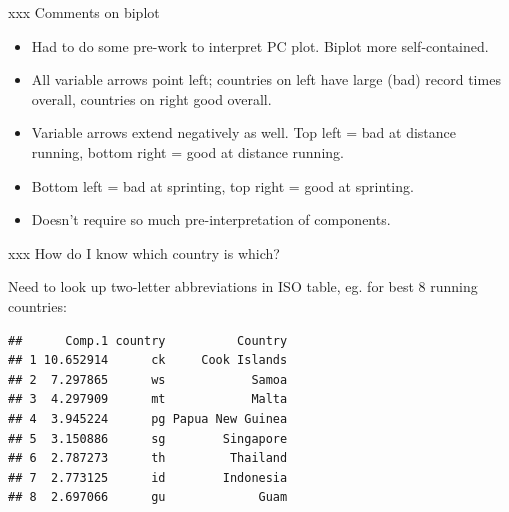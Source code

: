 \documentclass[ignorenonframetext,]{beamer}
\newenvironment{Shaded}{\begin{snugshade}}{\end{snugshade}}
\newcommand{\DataTypeTok}[1]{\textcolor[rgb]{0.13,0.29,0.53}{#1}}
\newcommand{\DecValTok}[1]{\textcolor[rgb]{0.00,0.00,0.81}{#1}}
\newcommand{\FloatTok}[1]{\textcolor[rgb]{0.00,0.00,0.81}{#1}}
\newcommand{\KeywordTok}[1]{\textcolor[rgb]{0.13,0.29,0.53}{\textbf{#1}}}
\newcommand{\NormalTok}[1]{#1}
\newcommand{\OperatorTok}[1]{\textcolor[rgb]{0.81,0.36,0.00}{\textbf{#1}}}
\newcommand{\StringTok}[1]{\textcolor[rgb]{0.31,0.60,0.02}{#1}}
\begin{document}
\begin{frame}{xxx Comments on biplot}
\protect\hypertarget{xxx-comments-on-biplot}{}

\begin{itemize}
\item
  Had to do some pre-work to interpret PC plot. Biplot more
  self-contained.
\item
  All variable arrows point left; countries on left have large (bad)
  record times overall, countries on right good overall.
\item
  Variable arrows extend negatively as well. Top left = bad at distance
  running, bottom right = good at distance running.
\item
  Bottom left = bad at sprinting, top right = good at sprinting.
\item
  Doesn't require so much pre-interpretation of components.
\end{itemize}

\end{frame}

\begin{frame}[fragile]{xxx How do I know which country is which?}
\protect\hypertarget{xxx-how-do-i-know-which-country-is-which}{}

Need to look up two-letter abbreviations in ISO table, eg. for best 8
running countries:

\begin{Shaded}
\end{Shaded}

\begin{verbatim}
##      Comp.1 country          Country
## 1 10.652914      ck     Cook Islands
## 2  7.297865      ws            Samoa
## 3  4.297909      mt            Malta
## 4  3.945224      pg Papua New Guinea
## 5  3.150886      sg        Singapore
## 6  2.787273      th         Thailand
## 7  2.773125      id        Indonesia
## 8  2.697066      gu             Guam
\end{verbatim}

\end{frame}
\end{document}
